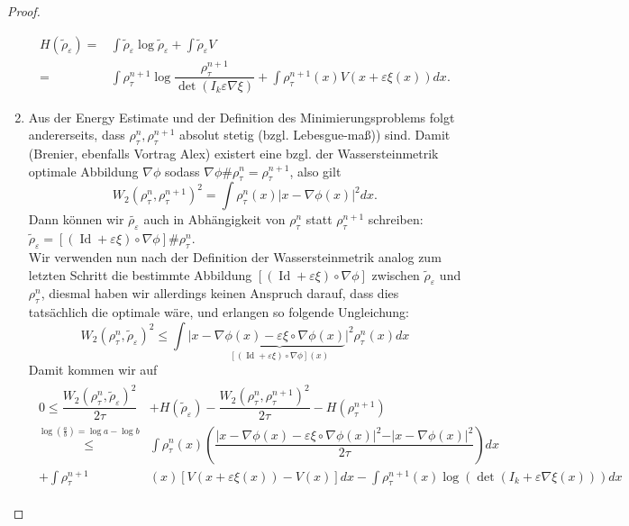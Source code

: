 \documentclass[11pt,a4paper,notitlepage]{scrreprt}
\begin{document}
\begin{proof}
\begin{enumerate}
\begin{align}
H(\tilde{\rho}_\varepsilon)=&\int\tilde{\rho}_\varepsilon\log\tilde{\rho}_\varepsilon+\int\tilde{\rho}_\varepsilon V\\
=&\int \rho_\tau^{n+1}\log\dfrac{\rho_\tau^{n+1}}{\det(I_k\varepsilon \nabla \xi)}+\int \rho_\tau^{n+1}(x)V(x+\varepsilon\xi(x))dx.
\end{align}
\item Aus der Energy Estimate und der Definition des Minimierungsproblems folgt andererseits, dass $\rho_\tau^n, \rho_\tau^{n+1}$ absolut stetig (bzgl. Lebesgue-maß)) sind. Damit (Brenier, ebenfalls Vortrag Alex) existert eine bzgl. der Wassersteinmetrik optimale Abbildung $\nabla \phi$ sodass $\nabla \phi \# \rho_\tau^n=\rho_\tau^{n+1}$, also gilt
\begin{equation}
W_2(\rho_\tau^n,\rho_\tau^{n+1})^2=\int \rho_\tau^n(x)\vert x-\nabla\phi(x)\vert^2 dx.
\end{equation}
Dann können wir $\tilde{\rho_\varepsilon}$ auch in Abhängigkeit von $\rho_\tau^n$ statt $\rho_\tau^{n+1}$ schreiben: $\tilde{\rho}_\varepsilon=[(\operatorname{Id}+\varepsilon\xi)\circ\nabla\phi]\#\rho_\tau^n$.\\
Wir verwenden nun nach der Definition der Wassersteinmetrik analog zum letzten Schritt die bestimmte Abbildung $[(\operatorname{Id}+\varepsilon\xi)\circ\nabla\phi]$ zwischen $\tilde{\rho}_\varepsilon$ und $\rho_\tau^n$, diesmal haben wir allerdings keinen Anspruch darauf, dass dies tatsächlich die optimale wäre, und erlangen so folgende Ungleichung:
\begin{equation*}
W_2(\rho_\tau^n,\tilde{\rho}_\varepsilon)^2 \leq \int \vert x-\underset{[(\operatorname{Id}+\varepsilon\xi)\circ\nabla\phi](x)}{\underbrace{\nabla \phi(x)-\varepsilon\xi\circ\nabla\phi(x)}}\vert^2 \rho_\tau^n(x)dx
\end{equation*}
Damit kommen wir auf
\begin{align}
\begin{split}
0\leq\dfrac{W_2(\rho_\tau^n,\tilde{\rho}_\varepsilon)^2}{2\tau}&+H(\tilde{\rho}_\varepsilon)-\dfrac{W_2(\rho_\tau^n,\rho_\tau^{n+1})^2}{2\tau}-H(\rho_\tau^{n+1})\\
\overset{\log(\frac{a}{b})=\log a-\log b}\leq&\int\rho_\tau^n(x)\left(\dfrac{\vert x-\nabla \phi(x)-\varepsilon\xi\circ\nabla\phi(x)\vert^2-\vert x-\nabla\phi(x)\vert^2}{2\tau}\right)dx\\
+\int\rho_\tau^{n+1}&(x)[V(x+\varepsilon\xi(x))-V(x)]dx-\int\rho_\tau^{n+1}(x)\log( \det(I_k+\varepsilon\nabla\xi(x)))dx \label{inequ}

\end{split}
\end{align}
\end{enumerate}
\end{proof}
\end{document}

